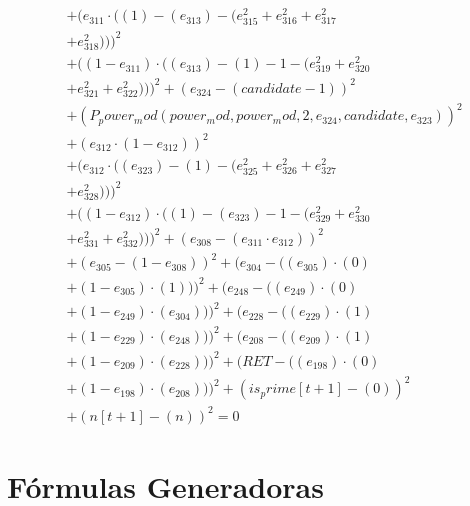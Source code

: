 \documentclass[10pt, a4paper]{article}
\begin{document}
\begin{align*}
& + (e_{311}  \cdot  ((1) - (e_{313}) - (e_{315}^{2} + e_{316}^{2} + e_{317}^{2} \\
& + e_{318}^{2})))^{2} \\
& + ((1 - e_{311})  \cdot  ((e_{313}) - (1) - 1 - (e_{319}^{2} + e_{320}^{2} \\
& + e_{321}^{2} + e_{322}^{2})))^{2} + (e_{324} - (candidate - 1))^{2} \\
& + (P_power_mod(power_mod, power_mod, 2, e_{324}, candidate, e_{323}))^{2} \\
& + (e_{312}  \cdot  (1 - e_{312}))^{2} \\
& + (e_{312}  \cdot  ((e_{323}) - (1) - (e_{325}^{2} + e_{326}^{2} + e_{327}^{2} \\
& + e_{328}^{2})))^{2} \\
& + ((1 - e_{312})  \cdot  ((1) - (e_{323}) - 1 - (e_{329}^{2} + e_{330}^{2} \\
& + e_{331}^{2} + e_{332}^{2})))^{2} + (e_{308} - (e_{311}  \cdot  e_{312}))^{2} \\
& + (e_{305} - (1 - e_{308}))^{2} + (e_{304} - ((e_{305})  \cdot  (0) \\
& + (1 - e_{305})  \cdot  (1)))^{2} + (e_{248} - ((e_{249})  \cdot  (0) \\
& + (1 - e_{249})  \cdot  (e_{304})))^{2} + (e_{228} - ((e_{229})  \cdot  (1) \\
& + (1 - e_{229})  \cdot  (e_{248})))^{2} + (e_{208} - ((e_{209})  \cdot  (1) \\
& + (1 - e_{209})  \cdot  (e_{228})))^{2} + (RET - ((e_{198})  \cdot  (0) \\
& + (1 - e_{198})  \cdot  (e_{208})))^{2} + (is_prime[t+1] - (0))^{2} \\
& + (n[t+1] - (n))^{2} = 0
\end{align*}\part{Fórmulas Generadoras}
\end{document}
